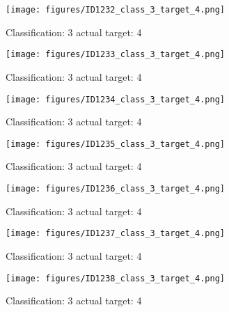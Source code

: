\begin{figure}[h!]
\begin{center}
\texttt{[image: figures/ID1232\_class\_3\_target\_4.png]}
\end{center}
\caption{ Classification: 3 actual target: 4}
\label{fig:ID1232_class_3_target_4}
\end{figure}
\begin{figure}[h!]
\begin{center}
\texttt{[image: figures/ID1233\_class\_3\_target\_4.png]}
\end{center}
\caption{ Classification: 3 actual target: 4}
\label{fig:ID1233_class_3_target_4}
\end{figure}
\begin{figure}[h!]
\begin{center}
\texttt{[image: figures/ID1234\_class\_3\_target\_4.png]}
\end{center}
\caption{ Classification: 3 actual target: 4}
\label{fig:ID1234_class_3_target_4}
\end{figure}
\begin{figure}[h!]
\begin{center}
\texttt{[image: figures/ID1235\_class\_3\_target\_4.png]}
\end{center}
\caption{ Classification: 3 actual target: 4}
\label{fig:ID1235_class_3_target_4}
\end{figure}
\begin{figure}[h!]
\begin{center}
\texttt{[image: figures/ID1236\_class\_3\_target\_4.png]}
\end{center}
\caption{ Classification: 3 actual target: 4}
\label{fig:ID1236_class_3_target_4}
\end{figure}
\begin{figure}[h!]
\begin{center}
\texttt{[image: figures/ID1237\_class\_3\_target\_4.png]}
\end{center}
\caption{ Classification: 3 actual target: 4}
\label{fig:ID1237_class_3_target_4}
\end{figure}
\begin{figure}[h!]
\begin{center}
\texttt{[image: figures/ID1238\_class\_3\_target\_4.png]}
\end{center}
\caption{ Classification: 3 actual target: 4}
\label{fig:ID1238_class_3_target_4}
\end{figure}
